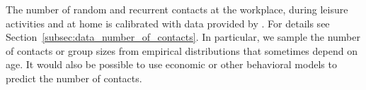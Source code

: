 The number of random and recurrent contacts at the workplace, during leisure activities
and at home is calibrated with data provided by \citet{Mossong2008}. For details see
Section~\ref{subsec:data_number_of_contacts}. In particular, we sample the number of
contacts or group sizes from empirical distributions that sometimes depend on age. It
would also be possible to use economic or other behavioral models to predict the number
of contacts.

